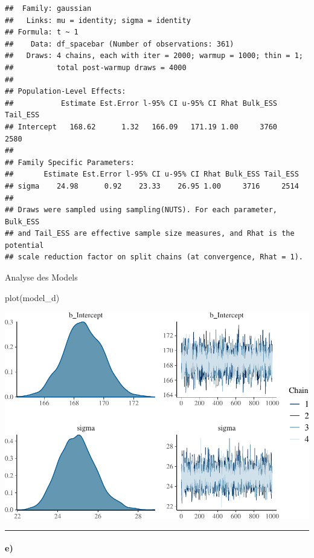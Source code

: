 \documentclass[
]{article}
\newenvironment{Shaded}{\begin{snugshade}}{\end{snugshade}}
\newcommand{\FunctionTok}[1]{\textcolor[rgb]{0.00,0.00,0.00}{#1}}
\newcommand{\NormalTok}[1]{#1}
\begin{document}
\begin{verbatim}
##  Family: gaussian 
##   Links: mu = identity; sigma = identity 
## Formula: t ~ 1 
##    Data: df_spacebar (Number of observations: 361) 
##   Draws: 4 chains, each with iter = 2000; warmup = 1000; thin = 1;
##          total post-warmup draws = 4000
## 
## Population-Level Effects: 
##           Estimate Est.Error l-95% CI u-95% CI Rhat Bulk_ESS Tail_ESS
## Intercept   168.62      1.32   166.09   171.19 1.00     3760     2580
## 
## Family Specific Parameters: 
##       Estimate Est.Error l-95% CI u-95% CI Rhat Bulk_ESS Tail_ESS
## sigma    24.98      0.92    23.33    26.95 1.00     3716     2514
## 
## Draws were sampled using sampling(NUTS). For each parameter, Bulk_ESS
## and Tail_ESS are effective sample size measures, and Rhat is the potential
## scale reduction factor on split chains (at convergence, Rhat = 1).
\end{verbatim}

Analyse des Models

\begin{Shaded}
\begin{Highlighting}[]
\FunctionTok{plot}\NormalTok{(model\_d)}
\end{Highlighting}
\end{Shaded}

\includegraphics{Loesung-Zettel-2_files/figure-latex/unnamed-chunk-7-1.pdf}

\begin{center}\rule{0.5\linewidth}{0.5pt}\end{center}

\hypertarget{e}{%
\paragraph{e)}\label{e}}
\end{document}
